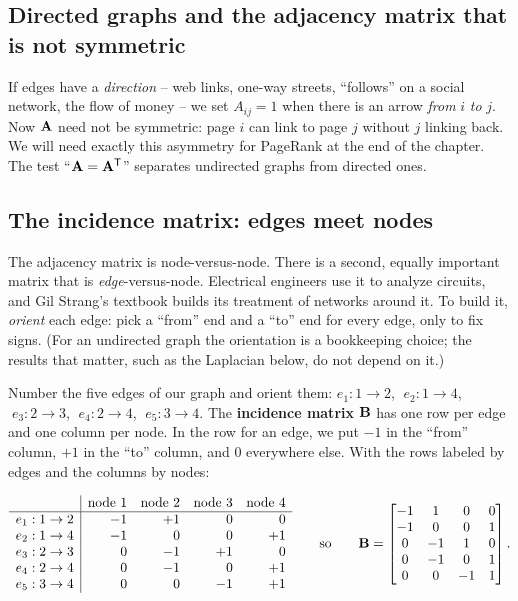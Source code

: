 \subsection{Directed graphs and the adjacency matrix that is not symmetric}

If edges have a \emph{direction} -- web links, one-way streets, ``follows'' on a social
network, the flow of money -- we set $A_{ij}=1$ when there is an arrow \emph{from} $i$
\emph{to} $j$. Now $\mathbf{A}$ need not be symmetric: page $i$ can link to page $j$ without
$j$ linking back. We will need exactly this asymmetry for PageRank at the end of the
chapter. The test ``$\mathbf{A}=\mathbf{A}^{\mathsf{T}}$'' separates undirected graphs from directed ones.

\subsection{The incidence matrix: edges meet nodes}
\label{ch35:incidence}

The adjacency matrix is node-versus-node. There is a second, equally important matrix that
is \emph{edge}-versus-node. Electrical engineers use it to analyze circuits, and Gil
Strang's textbook builds its treatment of networks around it. To build it, \emph{orient}
each edge: pick a ``from'' end and a ``to'' end for every edge, only to fix signs. (For an
undirected graph the orientation is a bookkeeping choice; the results that matter, such as
the Laplacian below, do not depend on it.)

Number the five edges of our graph and orient them:
$e_1: 1\!\to\!2$, $\;e_2: 1\!\to\!4$, $\;e_3: 2\!\to\!3$, $\;e_4: 2\!\to\!4$,
$\;e_5: 3\!\to\!4$. The \textbf{incidence matrix} $\mathbf{B}$ has one row per edge and one
column per node. In the row for an edge, we put $-1$ in the ``from'' column, $+1$ in the
``to'' column, and $0$ everywhere else. With the rows labeled by edges and the columns by
nodes:

\[
\begin{array}{c|rrrr}
 & \text{node } 1 & \text{node } 2 & \text{node } 3 & \text{node } 4\\ \hline
e_1: 1\to2 & -1 & +1 & 0 & 0 \\
e_2: 1\to4 & -1 & 0 & 0 & +1 \\
e_3: 2\to3 & 0 & -1 & +1 & 0 \\
e_4: 2\to4 & 0 & -1 & 0 & +1 \\
e_5: 3\to4 & 0 & 0 & -1 & +1
\end{array}
\qquad\text{so}\qquad
\mathbf{B} =
\begin{bmatrix}
-1 & 1 & 0 & 0\\
-1 & 0 & 0 & 1\\
0 & -1 & 1 & 0\\
0 & -1 & 0 & 1\\
0 & 0 & -1 & 1
\end{bmatrix}.
\]

